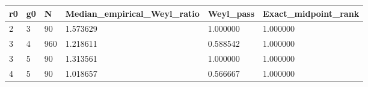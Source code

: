 \begin{tabular}{llllll}
\toprule
r0 & g0 & N & Median\_empirical\_Weyl\_ratio & Weyl\_pass & Exact\_midpoint\_rank \\
\midrule
2 & 3 & 90 & 1.573629 & 1.000000 & 1.000000 \\
3 & 4 & 960 & 1.218611 & 0.588542 & 1.000000 \\
3 & 5 & 90 & 1.313561 & 1.000000 & 1.000000 \\
4 & 5 & 90 & 1.018657 & 0.566667 & 1.000000 \\
\bottomrule
\end{tabular}
